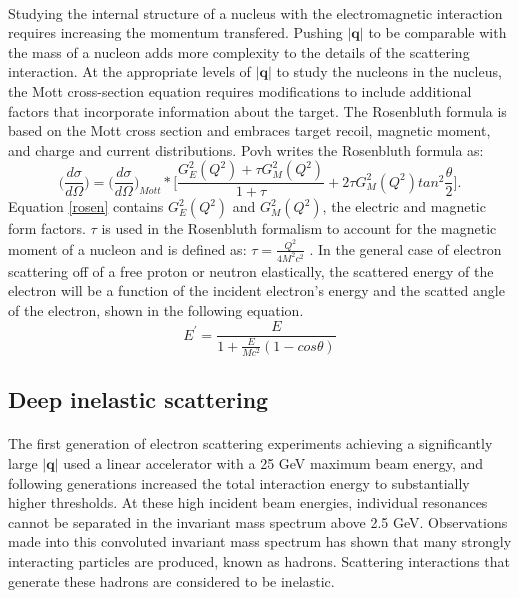\paragraph{} Studying the internal structure of a nucleus with the electromagnetic interaction requires increasing the momentum transfered. Pushing $|\boldsymbol{q}|$ to be comparable with the mass of a nucleon adds more complexity to the details of the scattering interaction. At the appropriate levels of $|\boldsymbol{q}|$ to study the nucleons in the nucleus, the Mott cross-section equation requires modifications to include additional factors that incorporate information about the target. The Rosenbluth formula is based on the Mott cross section and embraces target recoil, magnetic moment, and charge and current distributions. Povh writes the Rosenbluth formula as:
\begin{equation}
\label{rosen}
\bigg(\frac{d\sigma}{d\Omega}\bigg)=\bigg(\frac{d\sigma}{d\Omega}\bigg)_{Mott} *\bigg\lbrack \frac{G^2_E(Q^2) +\tau G^2_M(Q^2)}{1+\tau} + 2\tau G^2_M(Q^2)tan^2\frac{\theta}{2} \bigg\rbrack.
\end{equation}
Equation \ref{rosen} contains $G^2_E(Q^2)$ and $G^2_M(Q^2)$, the electric and magnetic form factors. $\tau$ is used in the Rosenbluth formalism to account for the magnetic moment of a nucleon and is defined as: $\tau = \frac{Q^2}{4M^2c^2}$ \cite{PnN}. In the general case of electron scattering off of a free proton or neutron elastically, the scattered energy of the electron will be a function of the incident electron's energy and the scatted angle of the electron, shown in the following equation.
\begin{equation}
E^\prime =\frac{E}{1+\frac{E}{Mc^2}(1-cos\theta)}
\end{equation}



\subsection{Deep inelastic scattering}\label{sec:DIS}
\paragraph{}The first generation of electron scattering experiments achieving a significantly large  $|\boldsymbol{q}|$ used a linear accelerator with a 25 GeV maximum beam energy, and following generations increased the total interaction energy to substantially higher thresholds. At these high incident beam energies, individual resonances cannot be separated in the invariant mass spectrum above 2.5 GeV. Observations made into this convoluted invariant mass spectrum has shown that many strongly interacting particles are produced, known as hadrons. Scattering interactions that generate these hadrons are considered to be inelastic. 

